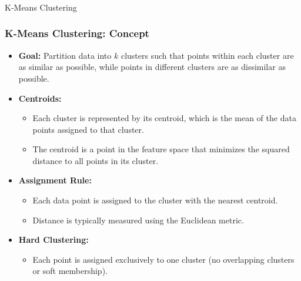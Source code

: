 \documentclass[aspectratio=169]{beamer}
\begin{document}
    \begin{frame}\frametitle{}
        \begin{center}
            {\LARGE K-Means Clustering}
        \end{center}
    \end{frame}

\begin{frame}
    \frametitle{K-Means Clustering: Concept}
    \begin{itemize}
        \item \textbf{Goal:} Partition data into \(k\) clusters such that points within each cluster are as similar as possible, while points in different clusters are as dissimilar as possible.
        \item \textbf{Centroids:} 
            \begin{itemize}
                \item Each cluster is represented by its centroid, which is the mean of the data points assigned to that cluster.
                \item The centroid is a point in the feature space that minimizes the squared distance to all points in its cluster.
            \end{itemize}
        \item \textbf{Assignment Rule:} 
            \begin{itemize}
                \item Each data point is assigned to the cluster with the nearest centroid.
                \item Distance is typically measured using the Euclidean metric.
            \end{itemize}
        \item \textbf{Hard Clustering:} 
            \begin{itemize}
                \item Each point is assigned exclusively to one cluster (no overlapping clusters or soft membership).
            \end{itemize}
    \end{itemize}
    \end{frame}
    
\end{document}
